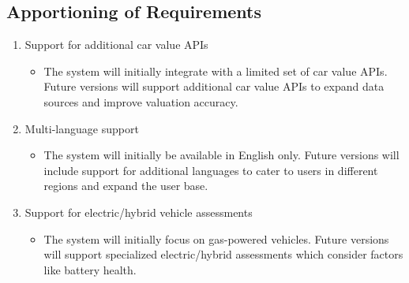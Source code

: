 \documentclass[]{article}
\begin{document}
\subsection{Apportioning of Requirements}
\label{sub:apportioning_of_requirements}
\begin{enumerate}
    \item Support for additional car value APIs
    \begin{itemize}
    \item The system will initially integrate with a limited set of car value APIs. Future versions will support additional car value APIs to expand data sources and improve valuation accuracy.
  \end{itemize}
    \item Multi-language support
    \begin{itemize}
    \item The system will initially be available in English only. Future versions will include support for additional languages to cater to users in different regions and expand the user base.
  \end{itemize}
    \item Support for electric/hybrid vehicle assessments
    \begin{itemize}
    \item The system will initially focus on gas-powered vehicles. Future versions will support specialized electric/hybrid assessments which consider factors like battery health.
  \end{itemize} 
\end{enumerate}

\newpage
\end{document}
